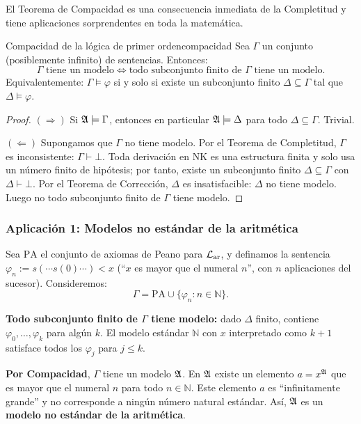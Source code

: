El Teorema de Compacidad es una consecuencia inmediata de la Completitud y tiene aplicaciones sorprendentes en toda la matemática.

\begin{teorema}{Compacidad de la lógica de primer orden}{compacidad}
Sea $\Gamma$ un conjunto (posiblemente infinito) de sentencias. Entonces:
\[
  \Gamma \text{ tiene un modelo} \iff \text{todo subconjunto finito de } \Gamma \text{ tiene un modelo.}
\]
Equivalentemente: $\Gamma \models \varphi$ si y solo si existe un subconjunto finito $\Delta \subseteq \Gamma$ tal que $\Delta \models \varphi$.
\end{teorema}

\begin{proof}
$(\Rightarrow)$ Si $\mathfrak{A} \models \Gamma$, entonces en particular $\mathfrak{A} \models \Delta$ para todo $\Delta \subseteq \Gamma$. Trivial.

$(\Leftarrow)$ Supongamos que $\Gamma$ no tiene modelo. Por el Teorema de Completitud, $\Gamma$ es inconsistente: $\Gamma \vdash \bot$. Toda derivación en NK es una estructura finita y solo usa un número finito de hipótesis; por tanto, existe un subconjunto finito $\Delta \subseteq \Gamma$ con $\Delta \vdash \bot$. Por el Teorema de Corrección, $\Delta$ es insatisfacible: $\Delta$ no tiene modelo. Luego no todo subconjunto finito de $\Gamma$ tiene modelo.
\end{proof}

\subsubsection{Aplicación 1: Modelos no estándar de la aritmética}

Sea $\mathrm{PA}$ el conjunto de axiomas de Peano para $\mathcal{L}_{\mathrm{ar}}$, y definamos la sentencia $\varphi_n := s(\cdots s(0)\cdots) < x$ (``$x$ es mayor que el numeral $n$'', con $n$ aplicaciones del sucesor). Consideremos:
\[
  \Gamma = \mathrm{PA} \cup \{\varphi_n : n \in \mathbb{N}\}.
\]

\textbf{Todo subconjunto finito de $\Gamma$ tiene modelo:} dado $\Delta$ finito, contiene $\varphi_0, \ldots, \varphi_k$ para algún $k$. El modelo estándar $\mathbb{N}$ con $x$ interpretado como $k+1$ satisface todos los $\varphi_j$ para $j \leq k$.

\textbf{Por Compacidad}, $\Gamma$ tiene un modelo $\mathfrak{A}$. En $\mathfrak{A}$ existe un elemento $a = x^{\mathfrak{A}}$ que es mayor que el numeral $n$ para todo $n \in \mathbb{N}$. Este elemento $a$ es ``infinitamente grande'' y no corresponde a ningún número natural estándar. Así, $\mathfrak{A}$ es un \textbf{modelo no estándar de la aritmética}.

